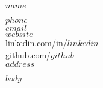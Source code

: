 \documentclass[a4paper,10pt]{article}
\begin{document}
\begin{center}
    \begin{minipage}[t]{0.6\textwidth}
        \raggedright
        {\huge \textbf{$name$}} %
    \end{minipage}%
    \begin{minipage}[t]{0.4\textwidth}
        \raggedleft
        \href{tel:$phone$}{$phone$ \faPhone} \\ %
        \href{mailto:$email$}{$email$ \faEnvelope}\\ %
        \href{https://$website$}{$website$ \faGlobe} \\ %
        \href{https://linkedin.com/in/$linkedin$}{linkedin.com/in/$linkedin$ \faLinkedin}\\ %
        \href{https://github.com/$github$}{github.com/$github$ \faGithub}\\
        $address$ \\ 
    \end{minipage}
\end{center}

\vspace{0.5cm} %

$body$
\end{document}
